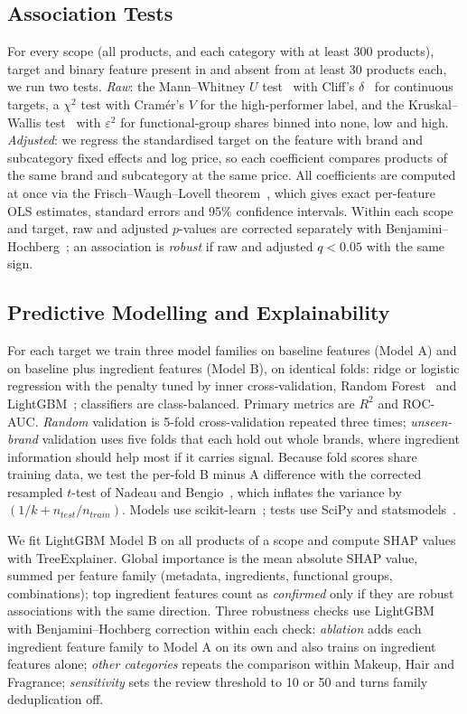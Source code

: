 \documentclass[11pt,a4paper]{article}
\begin{document}
\subsection{Association Tests}
For every scope (all products, and each category with at least 300 products), target and binary feature present in and absent from at least 30 products each, we run two tests. \emph{Raw}: the Mann--Whitney $U$ test~\cite{mann1947} with Cliff's $\delta$~\cite{cliff1993} for continuous targets, a $\chi^2$ test with Cram\'er's $V$ for the high-performer label, and the Kruskal--Wallis test~\cite{kruskal1952} with $\varepsilon^2$ for functional-group shares binned into none, low and high. \emph{Adjusted}: we regress the standardised target on the feature with brand and subcategory fixed effects and log price, so each coefficient compares products of the same brand and subcategory at the same price. All coefficients are computed at once via the Frisch--Waugh--Lovell theorem~\cite{frisch1933,lovell1963}, which gives exact per-feature OLS estimates, standard errors and 95\% confidence intervals. Within each scope and target, raw and adjusted $p$-values are corrected separately with Benjamini--Hochberg~\cite{benjamini1995}; an association is \emph{robust} if raw and adjusted $q<0.05$ with the same sign.

\subsection{Predictive Modelling and Explainability}
For each target we train three model families on baseline features (Model A) and on baseline plus ingredient features (Model B), on identical folds: ridge or logistic regression with the penalty tuned by inner cross-validation, Random Forest~\cite{breiman2001rf} and LightGBM~\cite{ke2017lightgbm}; classifiers are class-balanced. Primary metrics are $R^2$ and ROC-AUC. \emph{Random} validation is 5-fold cross-validation repeated three times; \emph{unseen-brand} validation uses five folds that each hold out whole brands, where ingredient information should help most if it carries signal. Because fold scores share training data, we test the per-fold B minus A difference with the corrected resampled $t$-test of Nadeau and Bengio~\cite{nadeau2003}, which inflates the variance by $(1/k + n_{test}/n_{train})$. Models use scikit-learn~\cite{pedregosa2011sklearn}; tests use SciPy and statsmodels~\cite{seabold2010statsmodels}.

We fit LightGBM Model B on all products of a scope and compute SHAP values~\cite{lundberg2017shap} with TreeExplainer. Global importance is the mean absolute SHAP value, summed per feature family (metadata, ingredients, functional groups, combinations); top ingredient features count as \emph{confirmed} only if they are robust associations with the same direction. Three robustness checks use LightGBM with Benjamini--Hochberg correction within each check: \emph{ablation} adds each ingredient feature family to Model A on its own and also trains on ingredient features alone; \emph{other categories} repeats the comparison within Makeup, Hair and Fragrance; \emph{sensitivity} sets the review threshold to 10 or 50 and turns family deduplication off.
\end{document}
